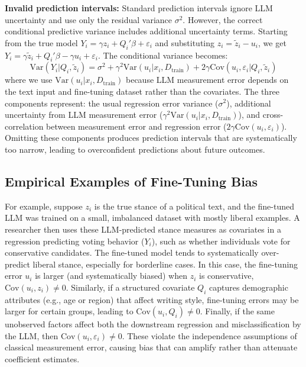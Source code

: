\documentclass[11pt]{article}
\begin{document}
\textbf{Invalid prediction intervals:} 
Standard prediction intervals ignore LLM uncertainty and use only the residual variance $\sigma^2$. 
However, the correct conditional predictive variance includes additional uncertainty terms. 
Starting from the true model $Y_i = \gamma z_i + Q_i'\beta + \varepsilon_i$ and substituting $z_i = \tilde{z}_i - u_i$, 
we get $Y_i = \gamma\tilde{z}_i + Q_i'\beta - \gamma u_i + \varepsilon_i$. The conditional variance becomes:
\begin{equation}
\text{Var}(Y_i | Q_i, \tilde{z}_i) = \sigma^2 + \gamma^2\text{Var}(u_i | x_i, D_{\text{train}}) + 2\gamma \text{Cov}(u_i, \varepsilon_i | Q_i, \tilde{z}_i) \tag{A3}
\end{equation}
where we use $\text{Var}(u_i | x_i, D_{\text{train}})$ because LLM measurement error depends on the text input and fine-tuning dataset rather than the covariates. 
The three components represent: the usual regression error variance ($\sigma^2$), 
additional uncertainty from LLM measurement error ($\gamma^2\text{Var}(u_i | x_i, D_{\text{train}})$), 
and cross-correlation between measurement error and regression error ($2\gamma \text{Cov}(u_i, \varepsilon_i)$). 
Omitting these components produces prediction intervals that are systematically too narrow, 
leading to overconfident predictions about future outcomes.

\subsection{Empirical Examples of Fine-Tuning Bias}

For example, suppose $z_i$ is the true stance of a political text, 
and the fine-tuned LLM was trained on a small, imbalanced dataset with mostly liberal examples. 
A researcher then uses these LLM-predicted stance measures as covariates in a regression predicting voting behavior ($Y_i$), 
such as whether individuals vote for conservative candidates. 
The fine-tuned model tends to systematically over-predict liberal stance, 
especially for borderline cases. In this case, the fine-tuning error $u_i$ is larger (and systematically biased) 
when $z_i$ is conservative, $\text{Cov}(u_i, z_i) \neq 0$. 
Similarly, if a structured covariate $Q_i$ captures demographic attributes (e.g., age or region) that affect writing style, 
fine-tuning errors may be larger for certain groups, leading to $\text{Cov}(u_i, Q_i) \neq 0$. 
Finally, if the same unobserved factors affect both the downstream regression and misclassification by the LLM, 
then $\text{Cov}(u_i, \varepsilon_i) \neq 0$. 
These violate the independence assumptions of classical measurement error, 
causing bias that can amplify rather than attenuate coefficient estimates.
\end{document}
